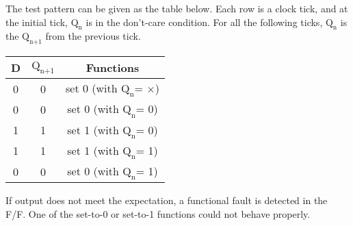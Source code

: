 The test pattern can be given as the table below. Each row is a clock tick, and at the initial tick, $\text{Q}_\text{n}$ is in the don't-care condition. For all the following ticks, $\text{Q}_\text{n}$ is the $\text{Q}_\text{n+1}$ from the previous tick.
\begin{center}
  \begin{tabular}{c | c | c}
    D & $\text{Q}_\text{n+1}$ & Functions \\
    \hline
    0 & 0 & set 0 (with $\text{Q}_\text{n}$= $\times$) \\
    0 & 0 & set 0 (with $\text{Q}_\text{n}$= 0) \\
    1 & 1 & set 1 (with $\text{Q}_\text{n}$= 0) \\
    1 & 1 & set 1 (with $\text{Q}_\text{n}$= 1) \\
    0 & 0 & set 0 (with $\text{Q}_\text{n}$= 1) \\
  \end{tabular}
\end{center}
If output does not meet the expectation, a functional fault is detected in the F/F. One of the set-to-0 or set-to-1 functions could not behave properly.
